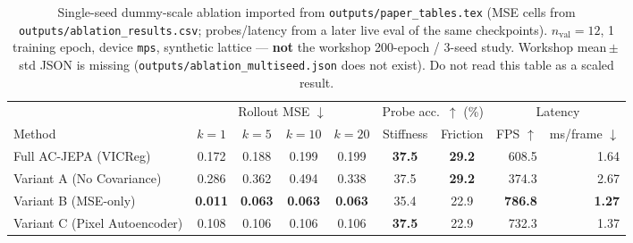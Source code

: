 \begin{table}[t]
  \centering
  \small
  \caption{Single-seed dummy-scale ablation imported from \texttt{outputs/paper\_tables.tex} (MSE cells from \texttt{outputs/ablation\_results.csv}; probes/latency from a later live eval of the same checkpoints). $n_{\mathrm{val}}=12$, 1 training epoch, device \texttt{mps}, synthetic lattice --- \textbf{not} the workshop 200-epoch / 3-seed study. Workshop mean\,$\pm$\,std JSON is missing (\texttt{outputs/ablation\_multiseed.json} does not exist). Do not read this table as a scaled result.}
  \label{tab:ac-jepa-ablation}
  \begin{tabular}{lccccccrr}
    \toprule
    & \multicolumn{4}{c}{Rollout MSE $\downarrow$}
      & \multicolumn{2}{c}{Probe acc.\ $\uparrow$ (\%)}
      & \multicolumn{2}{c}{Latency} \\
    \cmidrule(lr){2-5}
    \cmidrule(lr){6-7}
    \cmidrule(lr){8-9}
    Method & $k{=}1$ & $k{=}5$ & $k{=}10$ & $k{=}20$ & Stiffness & Friction & FPS $\uparrow$ & ms/frame $\downarrow$ \\
    \midrule
    Full AC-JEPA (VICReg) & 0.172 & 0.188 & 0.199 & 0.199 & \textbf{37.5} & \textbf{29.2} & 608.5 & 1.64 \\
    Variant A (No Covariance) & 0.286 & 0.362 & 0.494 & 0.338 & 37.5 & \textbf{29.2} & 374.3 & 2.67 \\
    Variant B (MSE-only) & \textbf{0.011} & \textbf{0.063} & \textbf{0.063} & \textbf{0.063} & 35.4 & 22.9 & \textbf{786.8} & \textbf{1.27} \\
    Variant C (Pixel Autoencoder) & 0.108 & 0.106 & 0.106 & 0.106 & \textbf{37.5} & 22.9 & 732.3 & 1.37 \\
    \bottomrule
  \end{tabular}
\end{table}
